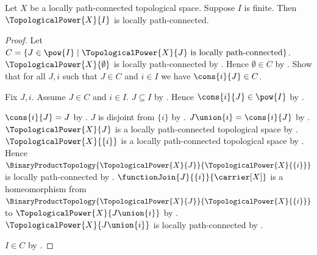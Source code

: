 \begin{theorem}\label{finite_topological_power_is_locally_path_connected}
    Let $X$ be a locally path-connected topological space.
    Suppose $I$ is finite.
    Then $\TopologicalPower{X}{I}$ is locally path-connected.
\end{theorem}
\begin{proof}
    Let $C=\{J\in\pow{I}\mid\text{$\TopologicalPower{X}{J}$ is locally path-connected}\}$.
    $\TopologicalPower{X}{\emptyset}$ is locally path-connected by
        .
    Hence $\emptyset\in C$ by .
    Show that for all $J,i$ such that $J\in C$ and $i\in I$ we have $\cons{i}{J}\in C$.
    \begin{subproof}
        Fix $J,i$.
        Assume $J\in C$ and $i\in I$.
        $J\subseteq I$ by .
        Hence $\cons{i}{J}\in\pow{I}$ by .
        \begin{byCase}
                $\cons{i}{J}=J$ by .
                $J$ is disjoint from $\{i\}$ by .
                $J\union\{i\}=\cons{i}{J}$ by .
                $\TopologicalPower{X}{J}$ is a locally path-connected topological space by
                    .
                $\TopologicalPower{X}{\{i\}}$ is a locally path-connected topological space by
                    .
                Hence $\BinaryProductTopology{\TopologicalPower{X}{J}}{\TopologicalPower{X}{\{i\}}}$
                    is locally path-connected by .
                $\functionJoin{J}{\{i\}}{\carrier[X]}$ is a homeomorphism from
                    $\BinaryProductTopology{\TopologicalPower{X}{J}}{\TopologicalPower{X}{\{i\}}}$
                    to $\TopologicalPower{X}{J\union\{i\}}$ by .
                $\TopologicalPower{X}{J\union\{i\}}$ is locally path-connected by
                    .
        \end{byCase}
    \end{subproof}
    $I\in C$ by .
\end{proof}

